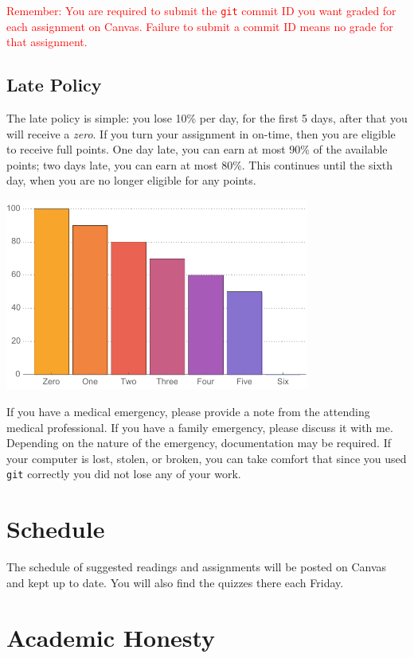 \documentclass{article}
\begin{document}
\textcolor{red}{Remember: You are required to submit the \texttt{git} commit ID
you want graded for each assignment on Canvas. Failure to submit a commit ID
means no grade for that assignment.}

\subsection{Late Policy}
The late policy is simple: you lose 10\% per day, for the first 5 days, after
that you will receive a \emph{zero}. If you turn your assignment in on-time,
then you are eligible to receive full points. One day late, you can earn at most
90\% of the available points; two days late, you can earn at most 80\%. This
continues until the sixth day, when you are no longer eligible for any points.

\centerline{\includegraphics[width=0.75\textwidth]{Tardiness.pdf}}

If you have a medical emergency, please provide a note from the attending
medical professional. If you have a family emergency, please discuss it with me.
Depending on the nature of the emergency, documentation may be required. If your
computer is lost, stolen, or broken, you can take comfort that since you used
\texttt{git} correctly you did not lose any of your work.

\section{Schedule}

The schedule of suggested readings and assignments will be posted on Canvas and
kept up to date. You will also find the quizzes there each Friday.

\section{Academic Honesty}
\end{document}
